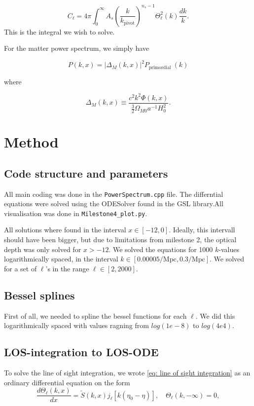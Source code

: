 \documentclass[12pt]{article}
\begin{document}
\begin{equation}\label{eq temp power spectrum}
C_{\ell}=4 \pi \int_{0}^{\infty} A_{s}\left(\frac{k}{k_{\mathrm{pivot}}}\right)^{n_{s}-1} \Theta_{\ell}^{2}(k) \frac{d k}{k}.
\end{equation}
This is the integral we wish to solve. 

For the matter power spectrum, we simply have 

\begin{equation}\label{eq matter power spectrum}
P(k, x)=\left|\Delta_{M}(k, x)\right|^{2} P_{\text {primordial }}(k)
\end{equation}

where 

\begin{equation}
\Delta_{M}(k, x) \equiv \frac{c^{2} k^{2} \Phi(k, x)}{\frac{3}{2} \Omega_{M 0} a^{-1} H_{0}^{2}}.
\end{equation}


\section{Method}
\subsection{Code structure and parameters}
All main coding was done in the \texttt{PowerSpectrum.cpp} file. The differntial equations were solved using the ODESolver found in the GSL library.All visualisation was done in \texttt{Milestone4\_plot.py}. 

All solutions where found in the interval $x\in[-12,0]$. Ideally, this intervall should have been bigger, but due to limitations from milestone 2, the optical depth was only solved for $x>-12$. We solved the equations for 1000 $k$-values logarithmically spaced, in the interval $k\in[0.00005/\mathrm{Mpc}, 0.3/\mathrm{Mpc}]$. We solved for a set of $\ell$'s in the range $\ell \in [2, 2000]$. 

\subsection{Bessel splines}
First of all, we needed to spline the bessel functions for each $\ell$. We did this logarithmically spaced with values ragning from $log(1e-8)$ to $log(4e4)$.

\subsection{LOS-integration to LOS-ODE}
To solve the line of sight integration, we wrote \cref{eq: line of sight integration} as an ordinary differential equation on the form
\begin{equation}
\frac{d \Theta_{\ell}(k, x)}{d x}=\tilde{S}(k, x) j_{\ell}\left[k\left(\eta_{0}-\eta\right)\right], \quad \Theta_{\ell}(k,-\infty)=0, 
\end{equation}
\end{document}
